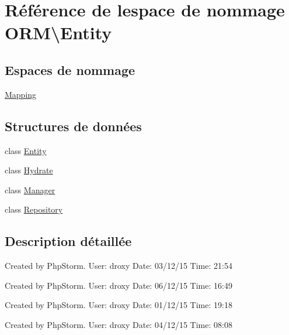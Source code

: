 \hypertarget{namespace_o_r_m_1_1_entity}{}\section{Référence de l\textquotesingle{}espace de nommage O\+RM\textbackslash{}Entity}
\label{namespace_o_r_m_1_1_entity}
\subsection*{Espaces de nommage}
\begin{DoxyCompactItemize}
\item 
 \hyperlink{namespace_o_r_m_1_1_entity_1_1_mapping}{Mapping}
\end{DoxyCompactItemize}
\subsection*{Structures de données}
\begin{DoxyCompactItemize}
\item 
class \hyperlink{class_o_r_m_1_1_entity_1_1_entity}{Entity}
\item 
class \hyperlink{class_o_r_m_1_1_entity_1_1_hydrate}{Hydrate}
\item 
class \hyperlink{class_o_r_m_1_1_entity_1_1_manager}{Manager}
\item 
class \hyperlink{class_o_r_m_1_1_entity_1_1_repository}{Repository}
\end{DoxyCompactItemize}


\subsection{Description détaillée}
Created by Php\+Storm. User\+: droxy Date\+: 03/12/15 Time\+: 21\+:54

Created by Php\+Storm. User\+: droxy Date\+: 06/12/15 Time\+: 16\+:49

Created by Php\+Storm. User\+: droxy Date\+: 01/12/15 Time\+: 19\+:18

Created by Php\+Storm. User\+: droxy Date\+: 04/12/15 Time\+: 08\+:08 
